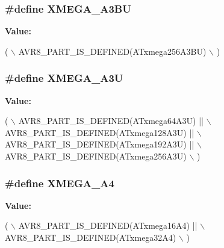 \subsubsection[{X\+M\+E\+G\+A\+\_\+\+A3\+B\+U}]{\setlength{\rightskip}{0pt plus 5cm}\#define X\+M\+E\+G\+A\+\_\+\+A3\+B\+U}\label{group__xmega__part__macros__group_ga98083f3307fe61cc2377948db87cd708}
{\bfseries Value\+:}
\begin{DoxyCode}
( \(\backslash\)
        AVR8\_PART\_IS\_DEFINED(ATxmega256A3BU) \(\backslash\)
        )
\end{DoxyCode}
\hypertarget{group__xmega__part__macros__group_gab5232598231cc5c17658e4b7cc5293ec}{}
\subsubsection[{X\+M\+E\+G\+A\+\_\+\+A3\+U}]{\setlength{\rightskip}{0pt plus 5cm}\#define X\+M\+E\+G\+A\+\_\+\+A3\+U}\label{group__xmega__part__macros__group_gab5232598231cc5c17658e4b7cc5293ec}
{\bfseries Value\+:}
\begin{DoxyCode}
( \(\backslash\)
        AVR8\_PART\_IS\_DEFINED(ATxmega64A3U)  || \(\backslash\)
        AVR8\_PART\_IS\_DEFINED(ATxmega128A3U) || \(\backslash\)
        AVR8\_PART\_IS\_DEFINED(ATxmega192A3U) || \(\backslash\)
        AVR8\_PART\_IS\_DEFINED(ATxmega256A3U) \(\backslash\)
        )
\end{DoxyCode}
\hypertarget{group__xmega__part__macros__group_ga7b83a133489c9896dbdc730615c83be8}{}
\subsubsection[{X\+M\+E\+G\+A\+\_\+\+A4}]{\setlength{\rightskip}{0pt plus 5cm}\#define X\+M\+E\+G\+A\+\_\+\+A4}\label{group__xmega__part__macros__group_ga7b83a133489c9896dbdc730615c83be8}
{\bfseries Value\+:}
\begin{DoxyCode}
( \(\backslash\)
        AVR8\_PART\_IS\_DEFINED(ATxmega16A4) || \(\backslash\)
        AVR8\_PART\_IS\_DEFINED(ATxmega32A4) \(\backslash\)
        )
\end{DoxyCode}
\hypertarget{group__xmega__part__macros__group_ga7625edcdd219df905c870d73c1689da6}{}
